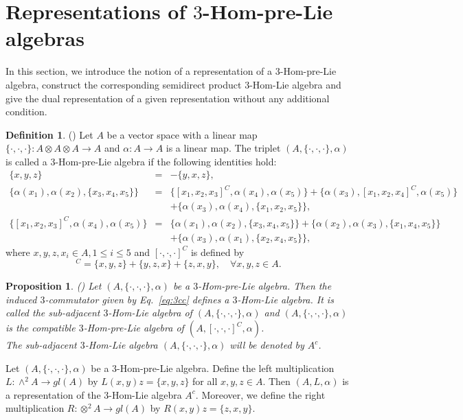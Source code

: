 \documentclass[a4paper,11pt]{article}
\newtheorem{pro}[thm]{Proposition}
\theoremstyle{definition}
\newtheorem{defi}{Definition}[section]
\begin{document}
\section{Representations of $3$-Hom-pre-Lie algebras}
In this section, we introduce the notion of a representation of a $3$-Hom-pre-Lie algebra, construct the corresponding semidirect product $3$-Hom-Lie algebra and give the dual representation  of a  given representation without any additional condition.
\begin{defi}(\cite{Guo&Zhang&Wang})
Let $A$ be a vector space with a linear map $\{\cdot,\cdot,\cdot\}:A\otimes A\otimes A\rightarrow A$ and $\alpha:A\rightarrow A$ is a linear map.
The triplet $(A,\{\cdot,\cdot,\cdot\},\alpha)$ is called a $3$-Hom-pre-Lie algebra if the following identities hold:
\begin{eqnarray}
\{x,y,z\}&=&-\{y,x,z\},\label{3-pre-Lie 0}\\
\nonumber\{\alpha(x_1),\alpha(x_2),\{x_3,x_4,x_5\}\}&=&\{[x_1,x_2,x_3]^C,\alpha(x_4),\alpha(x_5)\}+\{\alpha(x_3),[x_1,x_2,x_4]^C,\alpha(x_5)\}\\
&&+\{\alpha(x_3),\alpha(x_4),\{x_1,x_2,x_5\}\},\label{3-hom-pre-Lie 1}\\
\nonumber\{ [x_1,x_2,x_3]^C,\alpha(x_4), \alpha(x_5)\}&=&\{\alpha(x_1),\alpha(x_2),\{ x_3,x_4, x_5\}\}+\{\alpha(x_2),\alpha(x_3),\{ x_1,x_4,x_5\}\}\\
&&+\{\alpha(x_3),\alpha(x_1),\{ x_2,x_4, x_5\}\},\label{3-hom-pre-Lie 2}
\end{eqnarray}
 where $x,y,z, x_i\in A, 1\leq i\leq 5$ and $[\cdot,\cdot,\cdot]^C$ is defined by
\begin{equation}
[x,y,z]^C=\{x,y,z\}+\{y,z,x\}+\{z,x,y\},\quad \forall  x,y,z\in A.\label{eq:3cc}
\end{equation}
\end{defi}

 \begin{pro}(\cite{Guo&Zhang&Wang})
Let $(A,\{\cdot,\cdot,\cdot\},\alpha)$ be a $3$-Hom-pre-Lie algebra. Then the induced $3$-commutator given by Eq.~\eqref{eq:3cc} defines
a $3$-Hom-Lie algebra.
It  is called the  sub-adjacent $3$-Hom-Lie algebra of $(A,\{\cdot,\cdot,\cdot\},\alpha)$ and $(A,\{\cdot,\cdot,\cdot\},\alpha)$ is the compatible
$3$-Hom-pre-Lie algebra of  $(A,[\cdot,\cdot,\cdot]^C,\alpha)$.\\
The sub-adjacent $3$-Hom-Lie algebra $(A,\{\cdot,\cdot,\cdot\},\alpha)$ will be denoted by $A^c$.
\end{pro}
Let $(A,\{\cdot,\cdot,\cdot\},\alpha)$ be a $3$-Hom-pre-Lie algebra. Define the left multiplication $L:\wedge^2 A\longrightarrow gl(A)$ by
$L(x,y)z=\{x,y,z\}$ for all $x,y,z\in A$. Then $(A,L,\alpha)$ is a representation of the
$3$-Hom-Lie algebra $A^c$. Moreover, we define the right multiplication
$R:\otimes^2 A \to  gl(A)$ by $R(x,y)z=\{z,x,y\}$.
\end{document}

